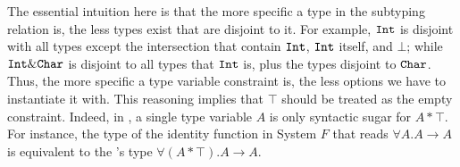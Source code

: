 The essential intuition here is that the more specific a type in the subtyping relation is, the less types
exist that are disjoint to it.
For example, $\texttt{Int}$ is disjoint with all types except the intersection that contain $\texttt{Int}$, $\texttt{Int}$
itself, and $\bot$; while $\texttt{Int} \& \texttt{Char}$ is disjoint to all types that $\texttt{Int}$ is, plus the
types disjoint to $\texttt{Char}$.
Thus, the more specific a type variable constraint is, the less options we have to instantiate it with.
This reasoning implies that $\top$ should be treated as the empty constraint.
Indeed, in \name, a single type variable $A$ is only syntactic sugar for $A * \top$.
For instance, the type of the identity function in System $F$ that reads $\forall A. A \to A$ is 
equivalent to the \name's type $\forall (A * \top). A \to A$.


\begin{comment}
First, if we consider our subtyping lattice as unbounded (i.e. no $\top$ and no $\bot$), then we have that
disjointness is covariant with respect to the subtyping relation.
More formally:
\[ \inferrule {\jwf \Gamma {A \disjoint B} \\ B \subtype C }
              {\jwf \Gamma {A \disjoint C}} \]

To illustrate this, take $A$ as $\tyint$ and $B$ as $\tybool \inter \tychar$.
This lemma states that every supertype of $\tybool \inter \tychar$, namely $\tybool$, $\tychar$ and 
$\tybool \inter \tychar$ itself are also disjoint with $\tyint$.
Coming back to a bounded subtyping lattice, let us now consider both bounds. 
If some type $A$ were to be disjoint with $\bot$, then by the lemma above $A$ will be disjoint to
virtually any type.
This means that, if $A$ is a type variable, then the possible types that it can be instantiated with
are the ones which are disjoint with every other type (otherwise the lemma above will no longer hold).
Clearly $\bot$ is not a suitable option,  
In other words, we can think of $\bot$ as the type as specific as the infinite intersection.
Conversely, $\top$ can be thought as specific - or rather, as general - as the 0-ary intersection.
\end{comment}

